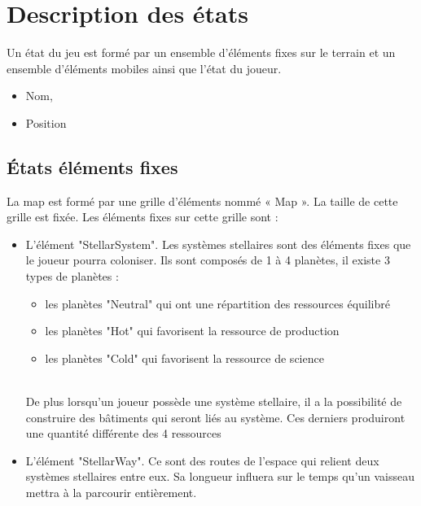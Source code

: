 \section{Description des états}

Un état du jeu est formé par un ensemble d’éléments fixes sur le terrain et un ensemble
d’éléments mobiles ainsi que l'état du joueur. 


\begin{itemize}
\item Nom,
\item Position
\end{itemize}

\subsection{États éléments fixes}

La map est formé par une grille d’éléments nommé « Map ». La taille de cette grille est
fixée. Les éléments fixes sur cette grille sont :\\

\begin{itemize}
\item L'élément "StellarSystem". Les systèmes stellaires sont des éléments
fixes que le joueur pourra coloniser. Ils sont composés de 1 à 4 planètes, il existe 3 types de planètes :\\

\begin{itemize}
\item les planètes "Neutral" qui ont une répartition des ressources équilibré
\item les planètes "Hot" qui favorisent la ressource de production
\item les planètes "Cold" qui favorisent la ressource de science
\end{itemize}\\

De plus lorsqu'un joueur possède une système stellaire, il a la possibilité de construire des bâtiments qui seront liés au système. Ces derniers produiront une quantité différente des 4 ressources\\





\item L'élément "StellarWay". Ce sont des routes de l'espace qui relient deux systèmes stellaires entre eux. Sa longueur influera sur le temps qu'un vaisseau mettra à la parcourir entièrement.
\end{itemize}

